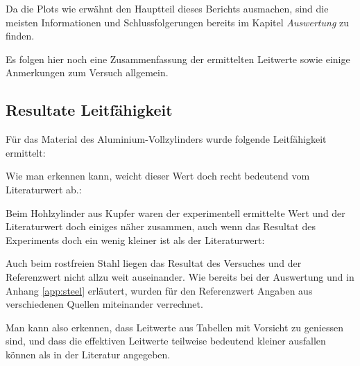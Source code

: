 Da  die  Plots   wie  erw\"ahnt  den  Hauptteil   dieses  Berichts  ausmachen,
sind  die  meisten Informationen  und  Schlussfolgerungen  bereits im  Kapitel
\emph{Auswertung} zu finden.

Es  folgen hier  noch  eine Zusammenfassung  der  ermittelten Leitwerte  sowie
einige Anmerkungen zum Versuch allgemein.


\subsection{Resultate Leitf\"ahigkeit}
\label{sec:results:subsec:sigma}

F\"ur das Material des  Aluminium-Vollzylinders wurde folgende Leitf\"ahigkeit
ermittelt:


Wie  man  erkennen   kann,  weicht  dieser  Wert  doch   recht  bedeutend  vom
Literaturwert ab.:

\vspace{0.2em}
\begin{center}
    
\end{center}
\vspace{0.2em}

Beim Hohlzylinder aus  Kupfer waren der experimentell ermittelte  Wert und der
Literaturwert  doch  einiges n\"aher  zusammen,  auch  wenn das  Resultat  des
Experiments doch ein wenig kleiner ist als der Literaturwert:


\begin{center}
    
\end{center}

Auch  beim  rostfreien  Stahl  liegen  das  Resultat  des  Versuches  und  der
Referenzwert nicht allzu weit auseinander. Wie  bereits bei der Auswertung und
in Anhang  \ref{app:steel} erl\"autert, wurden f\"ur  den Referenzwert Angaben
aus verschiedenen Quellen miteinander verrechnet.


\vspace{0.2em}
\begin{center}
    
\end{center}
\vspace{0.2em}

Man kann also erkennen, dass Leitwerte  aus Tabellen mit Vorsicht zu geniessen
sind, und dass die effektiven  Leitwerte teilweise bedeutend kleiner ausfallen
k\"onnen als in der Literatur angegeben.


